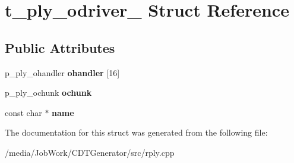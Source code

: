 \hypertarget{structt__ply__odriver__}{\section{t\-\_\-ply\-\_\-odriver\-\_\- Struct Reference}
\label{structt__ply__odriver__}
}
\subsection*{Public Attributes}
\begin{DoxyCompactItemize}
\item 
\hypertarget{structt__ply__odriver___a8e73dd635a21a1be2de07c7ead55fb44}{p\-\_\-ply\-\_\-ohandler {\bfseries ohandler} \mbox{[}16\mbox{]}}\label{structt__ply__odriver___a8e73dd635a21a1be2de07c7ead55fb44}

\item 
\hypertarget{structt__ply__odriver___a02635ba242394795d3716793cd1c3c87}{p\-\_\-ply\-\_\-ochunk {\bfseries ochunk}}\label{structt__ply__odriver___a02635ba242394795d3716793cd1c3c87}

\item 
\hypertarget{structt__ply__odriver___a510d75a4c2aa06c9266de2554636f600}{const char $\ast$ {\bfseries name}}\label{structt__ply__odriver___a510d75a4c2aa06c9266de2554636f600}

\end{DoxyCompactItemize}


The documentation for this struct was generated from the following file\-:\begin{DoxyCompactItemize}
\item 
/media/\-Job\-Work/\-C\-D\-T\-Generator/src/rply.\-cpp\end{DoxyCompactItemize}
